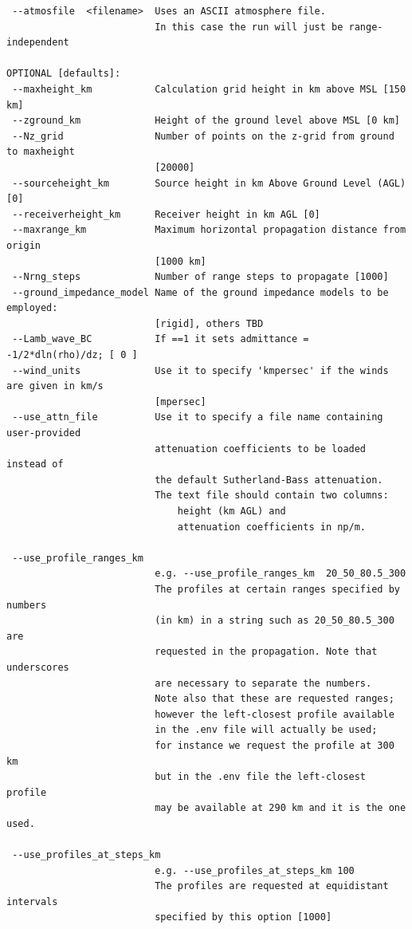 \begin{verbatim}
 --atmosfile  <filename>  Uses an ASCII atmosphere file.
                          In this case the run will just be range-independent

OPTIONAL [defaults]:
 --maxheight_km           Calculation grid height in km above MSL [150 km]
 --zground_km             Height of the ground level above MSL [0 km]
 --Nz_grid                Number of points on the z-grid from ground to maxheight
                          [20000]
 --sourceheight_km        Source height in km Above Ground Level (AGL) [0]
 --receiverheight_km      Receiver height in km AGL [0]
 --maxrange_km            Maximum horizontal propagation distance from origin
                          [1000 km]
 --Nrng_steps             Number of range steps to propagate [1000]
 --ground_impedance_model Name of the ground impedance models to be employed:
                          [rigid], others TBD
 --Lamb_wave_BC           If ==1 it sets admittance = -1/2*dln(rho)/dz; [ 0 ]
 --wind_units             Use it to specify 'kmpersec' if the winds are given in km/s 
                          [mpersec]
 --use_attn_file          Use it to specify a file name containing user-provided
                          attenuation coefficients to be loaded instead of 
                          the default Sutherland-Bass attenuation. 
                          The text file should contain two columns: 
                              height (km AGL) and 
                              attenuation coefficients in np/m.

 --use_profile_ranges_km
                          e.g. --use_profile_ranges_km  20_50_80.5_300     
                          The profiles at certain ranges specified by numbers
                          (in km) in a string such as 20_50_80.5_300 are
                          requested in the propagation. Note that underscores
                          are necessary to separate the numbers.
                          Note also that these are requested ranges;
                          however the left-closest profile available
                          in the .env file will actually be used; 
                          for instance we request the profile at 300 km 
                          but in the .env file the left-closest profile
                          may be available at 290 km and it is the one used.

 --use_profiles_at_steps_km
                          e.g. --use_profiles_at_steps_km 100
                          The profiles are requested at equidistant intervals 
                          specified by this option [1000]



\end{verbatim}
